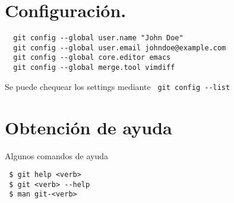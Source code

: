 \documentclass[]{article}
\title{}
\author{}
\begin{document}
\section{Configuración.}

\begin{verbatim}
  git config --global user.name "John Doe"
  git config --global user.email johndoe@example.com
  git config --global core.editor emacs
  git config --global merge.tool vimdiff
\end{verbatim}

Se puede chequear los settings mediante \verb= git config --list=

\section{Obtención de ayuda}

Algunos comandos de ayuda

\begin{verbatim}
 $ git help <verb>
 $ git <verb> --help
 $ man git-<verb>
\end{verbatim}
\end{document}
